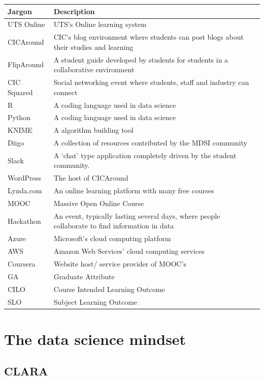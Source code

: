 \documentclass[]{book}
\theoremstyle{definition}
\theoremstyle{definition}
\theoremstyle{remark}
\begin{document}
\begin{tabular}{l|l}
\hline
Jargon & Description\\
\hline
UTS Online & UTS’s Online learning system\\
\hline
CICAround & CIC’s blog environment where students can post blogs about their studies and learning\\
\hline
FlipAround & A student guide developed by students for students in a collaborative environment\\
\hline
CIC Squared & Social networking event where students, staff and industry can connect\\
\hline
R & A coding language used in data science\\
\hline
Python & A coding language used in data science\\
\hline
KNIME & A algorithm building tool\\
\hline
Diigo & A collection of resources contributed by the MDSI community\\
\hline
Slack & A ‘chat’ type application completely driven by the student community.\\
\hline
WordPress & The host of CICAround\\
\hline
Lynda.com & An online learning platform with many free courses\\
\hline
MOOC & Massive Open Online Course\\
\hline
Hackathon & An event, typically lasting several days, where people collaborate to find information in data\\
\hline
Azure & Microsoft’s cloud computing platform\\
\hline
AWS & Amazon Web Services’ cloud computing services\\
\hline
Coursera & Website host/ service provider of MOOC’s\\
\hline
GA & Graduate Attribute\\
\hline
CILO & Course Intended Learning Outcome\\
\hline
SLO & Subject Learning Outcome\\
\hline
\end{tabular}

\chapter{The data science mindset}\label{the-data-science-mindset}

\section{CLARA}\label{clara}
\end{document}
